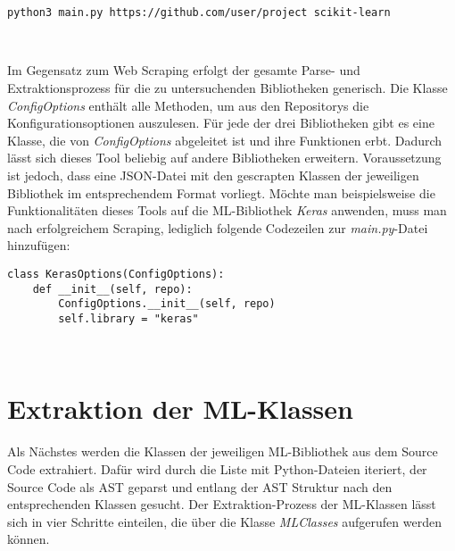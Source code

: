 \documentclass[german,bachelor]{swsLeipzig}
\begin{document}
\noindent\begin{minipage}{\linewidth}
\begin{lstlisting}[language=bash, frame=single, label=execute_coop, basicstyle=\small, caption={Kommandozeilenbefehl für die Extraktion von Konfigurationsoptionen von scikit-learn},captionpos=b]
python3 main.py https://github.com/user/project scikit-learn
\end{lstlisting}
\end{minipage}
\

\noindent Im Gegensatz zum Web Scraping erfolgt der gesamte Parse- und Extraktionsprozess für die zu untersuchenden Bibliotheken generisch.
Die Klasse \textit{ConfigOptions} enthält alle Methoden, um aus den Repositorys die Konfigurationsoptionen auszulesen.
Für jede der drei Bibliotheken gibt es eine Klasse, die von \textit{ConfigOptions} abgeleitet ist und ihre Funktionen erbt.
Dadurch lässt sich dieses Tool beliebig auf andere Bibliotheken erweitern.
Voraussetzung ist jedoch, dass eine JSON-Datei mit den gescrapten Klassen der jeweiligen Bibliothek im entsprechendem Format vorliegt.
Möchte man beispielsweise die Funktionalitäten dieses Tools auf die ML-Bibliothek \textit{Keras} anwenden, muss man nach erfolgreichem Scraping,
lediglich folgende Codezeilen zur \textit{main.py}-Datei hinzufügen:\\

\noindent\begin{minipage}{\linewidth}
\begin{lstlisting}[language=iPython, frame=single, label=keras,  basicstyle=\small, caption={Implementation einer Klasse zur Extraktion von Konfigurationsoptionen einer weiteren ML-Bibliothek},captionpos=b]
class KerasOptions(ConfigOptions):
    def __init__(self, repo):
        ConfigOptions.__init__(self, repo)
        self.library = "keras"
\end{lstlisting}
\end{minipage}
\

\section{Extraktion der ML-Klassen}\label{Classes}
Als Nächstes werden die Klassen der jeweiligen ML-Bibliothek aus dem Source Code extrahiert.
Dafür wird durch die Liste mit Python-Dateien iteriert, der Source Code als AST geparst und entlang der AST Struktur
nach den entsprechenden Klassen gesucht.
Der Extraktion-Prozess der ML-Klassen lässt sich in vier Schritte einteilen, die über die Klasse
\textit{MLClasses} aufgerufen werden können.
\end{document}
